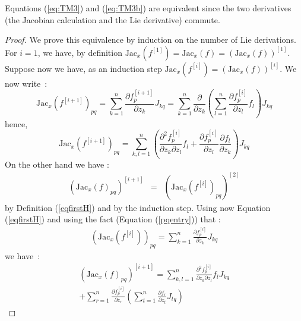 \documentclass{sig-alternate-05-2015} %
\newcommand\ForAuthors[1]%
 {\par\smallskip                     %
  \begin{center}%
   \fbox%
   {\parbox{0.9\linewidth}%
    {\raggedright\sc--- #1}%
   }%
  \end{center}%
  \par\smallskip                     %
 }
\begin{document}
Equations (\ref{eq:TM3}) and (\ref{eq:TM3b}) are equivalent since the two derivatives (the Jacobian calculation
and the Lie derivative) commute.  
\begin{proof}
We prove this equivalence by induction on the number of Lie derivations. 
For $i=1$, we have, by definition $\mbox{Jac}_x(f^{[1]})
=\mbox{Jac}_x(f)=(\mbox{Jac}_x(f))^{[1]}$. Suppose now we have, as an induction
step $\mbox{Jac}_x(f^{[i]})=(\mbox{Jac}_x(f))^{[i]}$. We now write~:
$$
\mbox{Jac}_x(f^{[i+1]})_{pq} 
= 
\sum\limits_{k=1}^n \frac{\partial f^{[i+1]}_p}{\partial z_k} J_{kq} 
= 
\sum\limits_{k=1}^n \frac{\partial}{\partial z_k} \left(
\sum\limits_{l=1}^n \frac{\partial{f^{[i]}_p}}{\partial z_l} f_l
\right)J_{kq}
$$
\noindent hence, 
\begin{equation}
\mbox{Jac}_x(f^{[i+1]})_{pq} =  \sum\limits_{k,l=1}^n \left(\frac{\partial^2 f_p^{[i]}}{\partial z_k \partial z_l} f_l
+\frac{\partial f_p^{[i]}}{\partial z_l}\frac{\partial f_l}{\partial z_k}\right)
J_{kq}
\label{firstpart}
\end{equation}
On the other hand we have : 
$$\begin{array}{rcl}
(\mbox{Jac}_x(f)_{pq})^{[i+1]} & = &
(\mbox{Jac}_x(f^{[i]})_{pq})^{[2]}
\end{array}$$
\noindent by Definition (\ref{eqfirstH}) and by the induction step. 
Using now Equation (\ref{eqfirstH}) and using the fact (Equation (\ref{pqentry})) that :
$$\begin{array}{rcl}
(\mbox{Jac}_x(f^{[i]}))_{pq} = \sum\limits_{k=1}^n \frac{\partial f^{[i]}_p}{\partial z_k} J_{kq}
\end{array}$$
\noindent we have~:  
\begin{multline}
(\mbox{Jac}_x(f)_{pq})^{[i+1]}  = 
\sum\limits_{k,l=1}^n \frac{\partial^2 f_p^{[i]}}{\partial z_k \partial z_l} f_l J_{kq} \\
+ \sum\limits_{r=1}^n \frac{\partial f_p^{[i]}}{\partial z_r}\left(\sum\limits_{t=1}^n
\frac{\partial f_r}{\partial z_t} J_{tq} \right)

\end{multline}
\end{proof}
\end{document}
